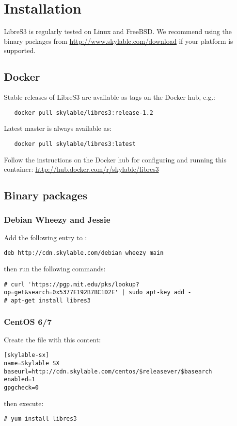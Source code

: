 \chapter{Installation}

LibreS3 is regularly tested on Linux and FreeBSD\@. We recommend using the
binary packages from \url{http://www.skylable.com/download} if your platform
is supported.

\section{Docker}

Stable releases of LibreS3 are available as tags on the Docker hub, e.g.:
\begin{lstlisting}
   docker pull skylable/libres3:release-1.2
\end{lstlisting}

Latest master is always available as:
\begin{lstlisting}
   docker pull skylable/libres3:latest
\end{lstlisting}

Follow the instructions on the Docker hub for configuring and running
this container: \url{http://hub.docker.com/r/skylable/libres3}

\section{Binary packages}

\subsection{Debian Wheezy and Jessie}
Add the following entry to :
\begin{lstlisting}
deb http://cdn.skylable.com/debian wheezy main
\end{lstlisting}
then run the following commands:
\begin{lstlisting}
# curl 'https://pgp.mit.edu/pks/lookup?op=get&search=0x5377E192B7BC1D2E' | sudo apt-key add -
# apt-get install libres3
\end{lstlisting}

\subsection{CentOS 6/7}
Create the file  with this content:
\begin{lstlisting}
[skylable-sx]
name=Skylable SX
baseurl=http://cdn.skylable.com/centos/$releasever/$basearch
enabled=1
gpgcheck=0
\end{lstlisting}
then execute:
\begin{lstlisting}
# yum install libres3
\end{lstlisting}

